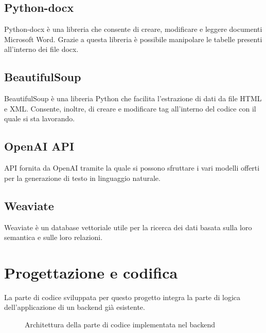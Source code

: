 \subsection{Python-docx}
\label{subsec:python-docx}
Python-docx è una libreria che consente di creare, modificare e leggere documenti Microsoft Word.
Grazie a questa libreria è possibile manipolare le tabelle presenti all'interno dei file docx.
\subsection{BeautifulSoup}
\label{subsec:beautifulsoup}
BeautifulSoup è una libreria Python che facilita l'estrazione di dati da file HTML e XML.
Consente, inoltre, di creare e modificare tag all'interno del codice con il quale si sta lavorando.
\subsection{OpenAI API}
API fornita da OpenAI tramite la quale si possono sfruttare i vari modelli offerti per la generazione di testo in linguaggio naturale.
\subsection{Weaviate}
\label{subsec:weav}
Weaviate è un database vettoriale utile per la ricerca dei dati basata sulla loro semantica e sulle loro relazioni. 

\section{Progettazione e codifica}
\label{sec:progettazione-codifica}
La parte di codice sviluppata per questo progetto integra la parte di logica dell'applicazione di un backend già esistente.

\begin{figure}[!h]
    \centering
    \caption{Architettura della parte di codice implementata nel backend}
\end{figure}

